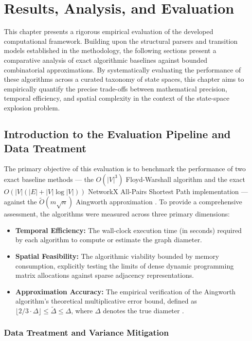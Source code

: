 \chapter{Results, Analysis, and Evaluation}

This chapter presents a rigorous empirical evaluation of the developed computational framework. Building upon the structural parsers and transition models established in the methodology, the following sections present a comparative analysis of exact algorithmic baselines against bounded combinatorial approximations. By systematically evaluating the performance of these algorithms across a curated taxonomy of state spaces, this chapter aims to empirically quantify the precise trade-offs between mathematical precision, temporal efficiency, and spatial complexity in the context of the state-space explosion problem.

\section{Introduction to the Evaluation Pipeline and Data Treatment}

The primary objective of this evaluation is to benchmark the performance of two exact baseline methods --- the $O(|V|^3)$ Floyd-Warshall algorithm and the exact $O(|V|(|E| + |V| \log |V|))$ NetworkX All-Pairs Shortest Path implementation --- against the $\tilde{O}(m\sqrt{n})$ Aingworth approximation \cite{aingworth96}. To provide a comprehensive assessment, the algorithms were measured across three primary dimensions:

\begin{itemize}
    \item \textbf{Temporal Efficiency:} The wall-clock execution time (in seconds) required by each algorithm to compute or estimate the graph diameter.
    \item \textbf{Spatial Feasibility:} The algorithmic viability bounded by memory consumption, explicitly testing the limits of dense dynamic programming matrix allocations against sparse adjacency representations.
    \item \textbf{Approximation Accuracy:} The empirical verification of the Aingworth algorithm's theoretical multiplicative error bound, defined as $\lfloor 2/3 \cdot \Delta \rfloor \le \tilde{\Delta} \le \Delta$, where $\Delta$ denotes the true diameter \cite{aingworth96}.
\end{itemize}

\subsection{Data Treatment and Variance Mitigation}


